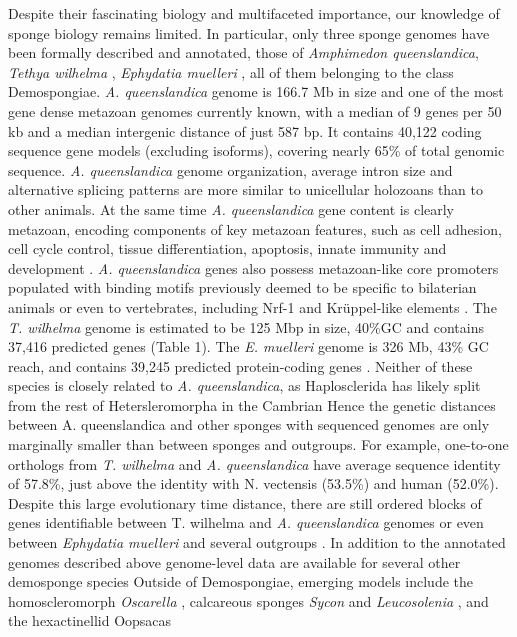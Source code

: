 
% 
Despite their fascinating biology and multifaceted importance, our knowledge of sponge biology remains limited.
%
In particular, only three sponge genomes have been formally described and annotated, those of \textit{Amphimedon queenslandica}, \textit{Tethya wilhelma} \cite{francis2017}, \textit{Ephydatia muelleri} \citep{kenny2020}, all of them belonging to the class Demospongiae.
%
\textit{A. queenslandica} genome is 166.7 Mb in size and one of the most gene dense metazoan genomes currently known, with a median of 9 genes per 50 kb and a median intergenic distance of just 587 bp.
%
It contains 40,122 coding sequence gene models (excluding isoforms), covering nearly 65\% of total genomic sequence.
%
\textit{A. queenslandica} genome organization, average intron size and alternative splicing patterns are more similar to unicellular holozoans than to other animals.
%
At the same time \textit{A. queenslandica} gene content is clearly metazoan, encoding components of key metazoan features, such as cell adhesion, cell cycle control, tissue differentiation, apoptosis, innate immunity and development \citep{srivastava2010}.
%
\textit{A. queenslandica} genes also possess metazoan-like core promoters populated with binding motifs previously deemed to be specific to bilaterian animals or even to vertebrates, including Nrf-1 and Krüppel-like elements \citep{fernandez-valverde2016}.
%
The \textit{T. wilhelma} genome is estimated to be 125 Mbp in size, 40\%GC and contains 37,416 predicted genes (Table 1).
%
The \textit{E. muelleri} genome is 326 Mb, 43\% GC reach, and contains 39,245 predicted protein-coding genes \cite{kenny2020}.
%
Neither of these species is closely related to \textit{A. queenslandica}, as Haplosclerida has likely split from the rest of Hetersleromorpha in the Cambrian \citep{lavrov2019}
%
Hence the genetic distances between {A. queenslandica} and other sponges with sequenced genomes are only marginally smaller than between sponges and outgroups.
%
For example, one-to-one orthologs from \textit{T. wilhelma} and \textit{A. queenslandica} have average sequence identity of 57.8\%, just above the identity with N. vectensis (53.5\%) and human (52.0\%).
%
Despite this large evolutionary time distance, there are still  ordered blocks of genes identifiable between T. wilhelma and \textit{A. queenslandica} genomes \citep{kenny2020} or even between \textit{Ephydatia muelleri} and several outgroups \citep{kenny2020}.
%
In addition to the annotated genomes described above genome-level data are available for several other demosponge species \citep{ryu2016, borisenko2016, francis2017} %
Outside of Demospongiae, emerging models include the homoscleromorph \textit{Oscarella} \citep{nichols2012, belahbib2018}, calcareous sponges \textit{Sycon} and \textit{Leucosolenia} \citep{fortunato2014b}, and the hexactinellid Oopsacas \citep{belahbib2018}
